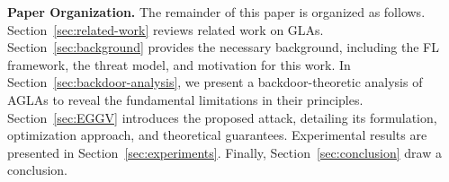 \textbf{Paper Organization.} The remainder of this paper is organized as follows. Section~\ref{sec:related-work} reviews related work on GLAs. Section~\ref{sec:background} provides the necessary background, including the FL framework, the threat model, and motivation for this work. In Section~\ref{sec:backdoor-analysis}, we present a backdoor-theoretic analysis of AGLAs to reveal the fundamental limitations in their principles. Section~\ref{sec:EGGV} introduces the proposed attack, detailing its formulation, optimization approach, and theoretical guarantees. Experimental results are presented in Section~\ref{sec:experiments}. Finally, Section~\ref{sec:conclusion} draw a conclusion.

















